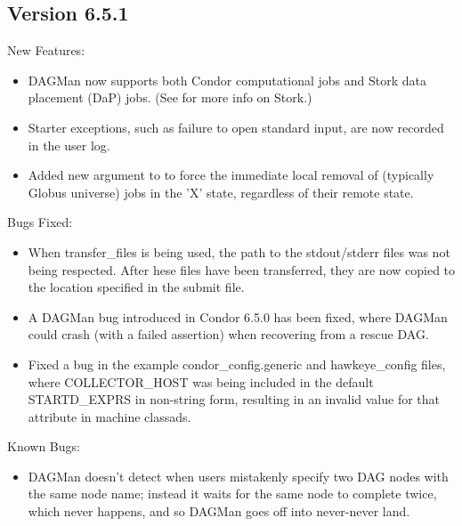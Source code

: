 \subsection{\label{sec:New-6-5-1}Version 6.5.1}

\noindent New Features:
\begin{itemize}

\item DAGMan now supports both Condor computational jobs and Stork data
placement (DaP) jobs.  (See 
for more info on Stork.)

\item Starter exceptions, such as failure to open standard input, are
now recorded in the user log.

\item Added new  argument to  to force the
immediate local removal of (typically Globus universe) jobs in the 'X'
state, regardless of their remote state.

\end{itemize}

\noindent Bugs Fixed:
\begin{itemize}

\item When transfer\_files is being used, the path to the stdout/stderr
files was not being respected.  After hese files have been transferred,
they are now copied to the location specified in the submit file.

\item A DAGMan bug introduced in Condor 6.5.0 has been fixed, where
DAGMan could crash (with a failed assertion) when recovering from a
rescue DAG.

\item Fixed a bug in the example condor\_config.generic and
hawkeye\_config files, where COLLECTOR\_HOST was being included in the
default STARTD\_EXPRS in non-string form, resulting in an invalid value
for that attribute in machine classads.

\end{itemize}

\noindent Known Bugs:
\begin{itemize}

\item DAGMan doesn't detect when users mistakenly specify two
DAG nodes with the same node name; instead it waits for the
same node to complete twice, which never happens, and so DAGMan
goes off into never-never land.

\end{itemize}

